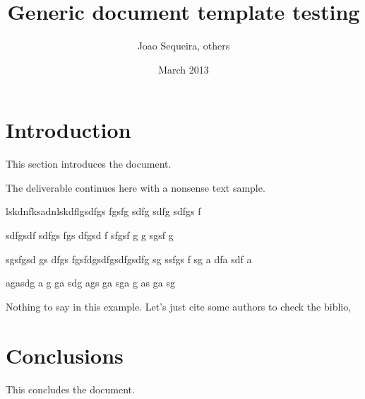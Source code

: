 \documentclass[]{monarch_doc}				%
\begin{document}
%
\title{Generic document template testing}

%

\author{Joao Sequeira, others}

\date{March 2013}

\maketitle

\tableofcontents


\section{Introduction}

This section introduces the document.

\newpage

The deliverable continues here with a nonsense text sample.

\newpage

lskdnfksadnlskdflgsdfgs fgsfg sdfg sdfg sdfgs f

sdfgsdf sdfgs fgs dfgsd f sfgsf g  g sgsf g

sgsfgsd gs dfgs fgsfdgsdfgsdfgsdfg sg ssfgs f sg a dfa sdf a


agasdg a g ga sdg ags ga sga g as ga sg


Nothing to say in this example. Let's just cite some authors to check the biblio,
\cite{Bertsekas:1999, Astrom.Wittenmark:1984,Sadowska.et.al:2011}

\section{Conclusions}

This concludes the document.




\printindex
\end{document}
